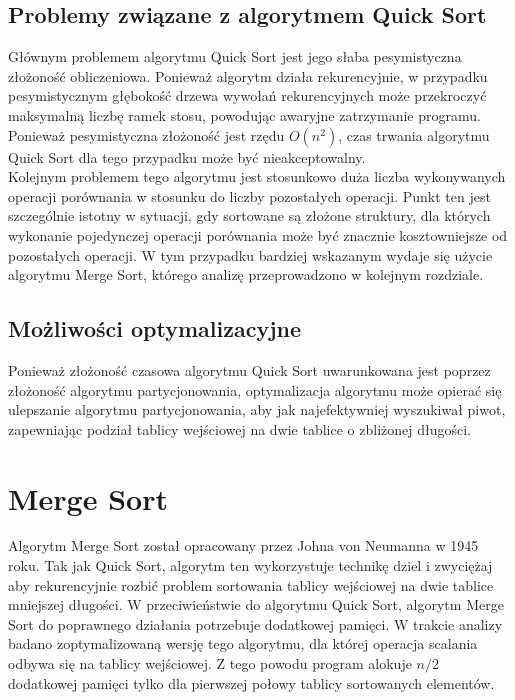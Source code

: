 \begin{figure}[]
	\centering
	
	\caption[]{}
	\label{fig:quick-sort-density}
\end{figure}

\subsection{Problemy związane z algorytmem Quick Sort}
Głównym problemem algorytmu Quick Sort jest jego słaba pesymistyczna złożoność obliczeniowa. Ponieważ algorytm działa rekurencyjnie, w przypadku pesymistycznym głębokość drzewa wywołań rekurencyjnych może przekroczyć maksymalną liczbę ramek stosu, powodując awaryjne zatrzymanie programu. Ponieważ pesymistyczna złożoność jest rzędu $O(n^2)$, czas trwania algorytmu Quick Sort dla tego przypadku może być nieakceptowalny.\\

Kolejnym problemem tego algorytmu jest stosunkowo duża liczba wykonywanych operacji porównania w stosunku do liczby pozostałych operacji. Punkt ten jest szczególnie istotny w sytuacji, gdy sortowane są złożone struktury, dla których
wykonanie pojedynczej operacji porównania może być znacznie kosztowniejsze od pozostałych operacji. W tym przypadku bardziej wskazanym wydaje się użycie algorytmu Merge Sort, którego analizę przeprowadzono w kolejnym rozdziale.

\subsection{Możliwości optymalizacyjne}
Ponieważ złożoność czasowa algorytmu Quick Sort uwarunkowana jest poprzez złożoność algorytmu partycjonowania, optymalizacja algorytmu może opierać się ulepszanie algorytmu partycjonowania, aby jak najefektywniej wyszukiwał piwot, zapewniając podział tablicy wejściowej na dwie tablice o zbliżonej długości.
 

\section{Merge Sort}


Algorytm Merge Sort został opracowany przez Johna von Neumanna w 1945 roku. Tak jak Quick Sort, algorytm ten wykorzystuje technikę dziel i zwyciężaj aby rekurencyjnie rozbić problem sortowania tablicy wejściowej na dwie tablice mniejszej długości. W przeciwieństwie do algorytmu Quick Sort, algorytm Merge Sort do poprawnego działania potrzebuje dodatkowej pamięci. W trakcie analizy badano zoptymalizowaną wersję tego algorytmu, dla której operacja scalania odbywa się na tablicy wejściowej. Z tego powodu program alokuje $n/2$ dodatkowej pamięci tylko dla pierwszej połowy tablicy sortowanych elementów.\\

